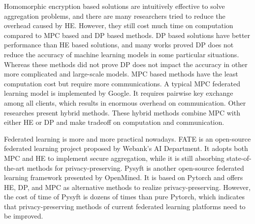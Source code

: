Homomorphic encryption based solutions are intuitively effective to solve aggregation problems, and there are many researchers tried to reduce the overhead caused by HE\cite{abs-1711-10677,BatchCrypt}. However, they still cost much time on computation compared to MPC based and DP based methods. DP based solutions have better performance than HE based solutions, and many works proved DP does not reduce the accuracy of machine learning models in some particular situations\cite{Bayesian,DPAnalysis,ZhuDP,geyer2017differentially}. Whereas these methods did not prove DP does not impact the accuracy in other more complicated and large-scale models. MPC based methods have the least computation cost but require more communications. A typical MPC federated learning model is implemented by Google\cite{Practical}. It requires pairwise key exchange among all clients, which results in enormous overhead on communication. Other researches present hybrid methods\cite{Hybrid,HybridAlpha}. These hybrid methods combine MPC with either HE or DP and make tradeoff on computation and communication.

Federated learning is more and more practical nowadays. FATE\cite{fate} is an open-source federated learning project proposed by Webank’s AI Department. It adopts both MPC and HE to implement secure aggregation, while it is still absorbing state-of-the-art methods for privacy-preserving. Pysyft\cite{pysyft} is another open-source federated learning framework presented by OpenMined. It is based on Pytorch and offers HE, DP, and MPC as alternative methods to realize privacy-preserving. However, the cost of time of Pysyft is dozens of times than pure Pytorch, which indicates that privacy-preserving methods of current federated learning platforms need to be improved.
